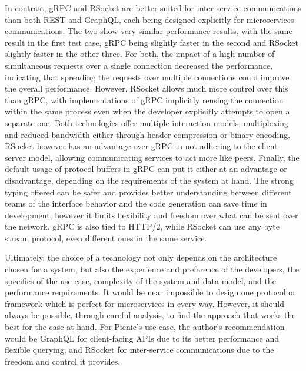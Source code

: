 In contrast, gRPC and RSocket are better suited for inter-service communications than both REST and GraphQL, each being designed explicitly for microservices communications. The two show very similar performance results, with the same result in the first test case, gRPC being slightly faster in the second and RSocket slightly faster in the other three. For both, the impact of a high number of simultaneous requests over a single connection decreased the performance, indicating that spreading the requests over multiple connections could improve the overall performance. However, RSocket allows much more control over this than gRPC, with implementations of gRPC implicitly reusing the connection within the same process even when the developer explicitly attempts to open a separate one. Both technologies offer multiple interaction models, multiplexing and reduced bandwidth either through header compression or binary encoding. RSocket however has an advantage over gRPC in not adhering to the client-server model, allowing communicating services to act more like peers. Finally, the default usage of protocol buffers in gRPC can put it either at an advantage or disadvantage, depending on the requirements of the system at hand. The strong typing offered can be safer and provides better understanding between different teams of the interface behavior and the code generation can save time in development, however it limits flexibility and freedom over what can be sent over the network. gRPC is also tied to HTTP/2, while RSocket can use any byte stream protocol, even different ones in the same service.

Ultimately, the choice of a technology not only depends on the architecture chosen for a system, but also the experience and preference of the developers, the specifics of the use case, complexity of the system and data model, and the performance requirements. It would be near impossible to design one protocol or framework which is perfect for microservices in every way. However, it should always be possible, through careful analysis, to find the approach that works the best for the case at hand. For Picnic's use case, the author's recommendation would be GraphQL for client-facing APIs due to its better performance and flexible querying, and RSocket for inter-service communications due to the freedom and control it provides.